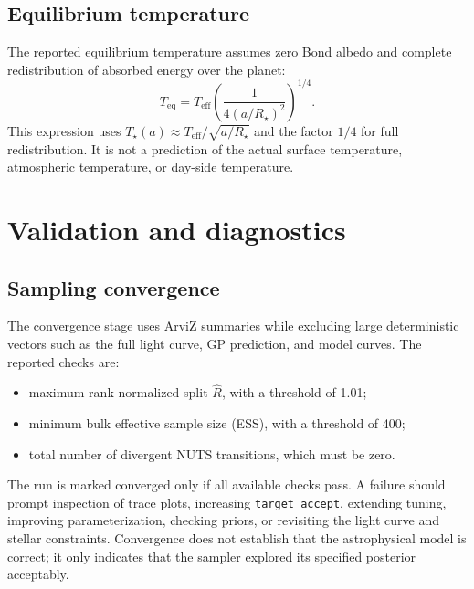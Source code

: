 \documentclass[12pt,a4paper,oneside]{report}
\newcommand{\Rstar}{\ensuremath{R_{\star}}}
\newcommand{\Teff}{\ensuremath{T_{\mathrm{eff}}}}
\newcommand{\code}[1]{\texttt{\small #1}}
\begin{document}
\section{Equilibrium temperature}
The reported equilibrium temperature assumes zero Bond albedo and complete
redistribution of absorbed energy over the planet:
\begin{equation}
  T_{\mathrm{eq}}=\Teff\left(\frac{1}{4(a/\Rstar)^2}\right)^{1/4}.
\end{equation}
This expression uses \(T_\star(a)\approx\Teff/\sqrt{a/\Rstar}\) and the
factor \(1/4\) for full redistribution. It is not a prediction of the actual
surface temperature, atmospheric temperature, or day-side temperature.

\chapter{Validation and diagnostics}
\section{Sampling convergence}
The convergence stage uses ArviZ summaries while excluding large deterministic
vectors such as the full light curve, GP prediction, and model curves. The
reported checks are:
\begin{itemize}
  \item maximum rank-normalized split \(\hat R\), with a threshold of 1.01;
  \item minimum bulk effective sample size (ESS), with a threshold of 400;
  \item total number of divergent NUTS transitions, which must be zero.
\end{itemize}
The run is marked converged only if all available checks pass. A failure should
prompt inspection of trace plots, increasing \code{target\_accept}, extending
tuning, improving parameterization, checking priors, or revisiting the light
curve and stellar constraints. Convergence does not establish that the
astrophysical model is correct; it only indicates that the sampler explored its
specified posterior acceptably.
\end{document}
